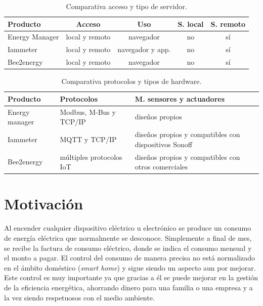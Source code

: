 \begin{table}[h]
	\centering
	\caption[Comparativa de soluciones entre acceso y servidor]{Comparativa acceso y tipo de servidor.}
	\begin{tabular}{l c c c c }    
		\toprule
		\textbf{Producto} & \textbf{Acceso}  & \textbf{Uso} & \textbf{S. local}   & \textbf{S. remoto} \\
		\midrule
		Energy Manager & local y remoto 	& navegador & no & sí  \\		
		Iammeter	 & local y remoto	& navegador y app. & no & sí  \\
		Bee2energy	 & local y remoto	& navegador & no & sí  \\
		\bottomrule
		\hline
	\end{tabular}
	\label{tab:tabla2}
\end{table}




\begin{table}[h]
	\centering
	\caption[Comparativa de soluciones entre protocolos y hardware]{Comparativa protocolos y tipos de hardware.}
	\begin{tabular}{l p{5cm} p{5cm}}    
		\toprule
		\textbf{Producto} 	 & \textbf{Protocolos}  & \textbf{M. sensores y actuadores}  \\
		\midrule
		Energy manager & Modbus, M-Bus  y TCP/IP 	& diseños propios \\		
		Iammeter	 & MQTT y TCP/IP	& diseños propios y compatibles con       dispositivos Sonoff   \\
		Bee2energy	 & múltiples protocolos IoT		& diseños propios y compatibles con otros comerciales  \\
		\bottomrule
		\hline
	\end{tabular}
	\label{tab:tabla3}
\end{table}






\section{Motivación}
Al encender cualquier dispositivo eléctrico u electrónico se produce un consumo de energía eléctrica que normalmente se desconoce. Simplemente a final de mes, se recibe la factura de consumo eléctrico, donde se indica el consumo mensual y el monto a pagar. El control del consumo de manera precisa no está normalizado en el ámbito doméstico (\emph{smart home}) y sigue siendo un aspecto aun por mejorar. Este control es muy importante ya que gracias a él se puede mejorar en la gestión de la eficiencia energética, ahorrando dinero para una familia o una empresa y a la vez siendo respetuosos con el medio ambiente.

